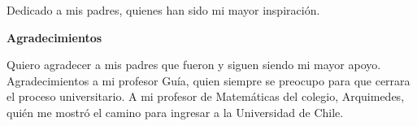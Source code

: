 

\newpage

	\begin{flushright}
	Dedicado a mis padres, quienes han sido mi mayor inspiración.
	\end{flushright}

\newpage

	\vspace{13cm}

	\huge
	\textbf{Agradecimientos}

		\normalsize
		Quiero agradecer a mis padres que fueron y siguen siendo mi mayor apoyo.
		Agradecimientos a mi profesor Guía, quien siempre se preocupo para que cerrara el proceso universitario.
		A mi profesor de Matemáticas del colegio, Arquimedes, quién me mostró el camino para ingresar a la Universidad de Chile.